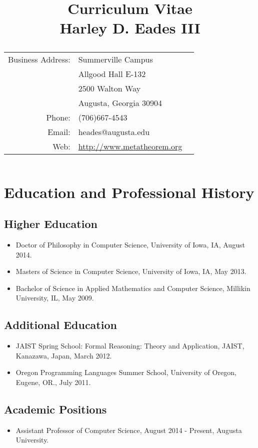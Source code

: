 \documentclass{article}
\title{\textbf{Curriculum Vitae\\Harley D. Eades III}\\
  \vspace{10px}
  {\normalsize
  \begin{tabular}{rll}
    Business Address: & Summerville Campus\\
                      & Allgood Hall E-132\\
                      & 2500 Walton Way\\
                      & Augusta, Georgia 30904\\
    Phone:            & (706)667-4543\\
    Email:            & heades@augusta.edu\\
    Web:              & \url{http://www.metatheorem.org}\\
\end{tabular}
}}
\date{}
\begin{document}
\maketitle



  
  \section{Education and Professional History} 

  \subsection{Higher Education}
  \label{subsec:higher_education}
  \begin{itemize}
  \item[] Doctor of Philosophy in Computer Science, University of Iowa, IA, August 2014.
  \item[] Masters of Science in Computer Science, University of Iowa, IA, May 2013.
  \item[] Bachelor of Science in Applied Mathematics and Computer Science, Millikin University, IL, May 2009.
  \end{itemize}
		
  \subsection{Additional Education} 
  \begin{itemize}
  \item[] JAIST Spring School: Formal Reasoning: Theory and Application, JAIST, Kanazawa, Japan, March 2012.

  \item[] Oregon Programming Languages Summer School, University of Oregon, Eugene, OR., July 2011.
  \end{itemize}
  
  \subsection{Academic Positions}
  \begin{itemize}
  \item[] Assistant Professor of Computer Science, August 2014 - Present, Augusta University.
  \end{itemize}
\end{document}
